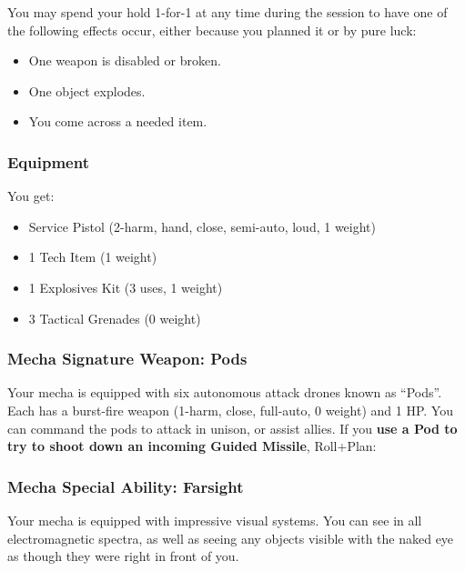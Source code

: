 
You may spend your hold 1-for-1 at any time during the session to have one of the following effects occur, either because you planned it or by pure luck:
\begin{itemize}
\item One weapon is disabled or broken.
\item One object explodes.
\item You come across a needed item.
\end{itemize}


\subsubsection{Equipment}
You get:
\begin{itemize}
\item Service Pistol (2-harm, hand, close, semi-auto, loud, 1 weight) 
\item 1 Tech Item (1 weight)
\item 1 Explosives Kit (3 uses, 1 weight)
\item 3 Tactical Grenades (0 weight)
\end{itemize}

\subsubsection{Mecha Signature Weapon: Pods}
Your mecha is equipped with six autonomous attack drones known as ``Pods''. Each has a burst-fire weapon (1-harm, close, full-auto, 0 weight) and 1 HP. You can command the pods to attack in unison, or assist allies. If you \textbf{use a Pod to try to shoot down an incoming Guided Missile}, Roll+Plan:

\subsubsection{Mecha Special Ability: Farsight}
Your mecha is equipped with impressive visual systems. You can see in all electromagnetic spectra, as well as seeing any objects visible with the naked eye as though they were right in front of you.
